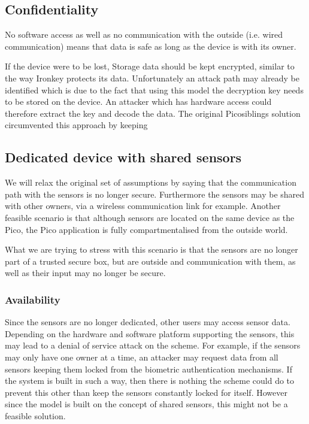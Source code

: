 	\subsection*{Confidentiality}
	No software access as well as no communication with the outside (i.e. wired communication) means that data is safe as long as the device is with its owner.
	
	If the device were to be lost, 
	Storage data should be kept encrypted, similar to the way Ironkey \cite{} protects its data. Unfortunately an attack path may already be identified which is due to the fact that using this model the decryption key needs to be stored on the device. An attacker which has hardware access could therefore extract the key and decode the data. The original Picosiblings solution circumvented this approach by keeping 

\subsection{Dedicated device with shared sensors}
We will relax the original set of assumptions by saying that the communication path with the sensors is no longer secure. Furthermore the sensors may be shared with other owners, via a wireless communication link for example. Another feasible scenario is that although sensors are located on the same device as the Pico, the Pico application is fully compartmentalised from the outside world. 

What we are trying to stress with this scenario is that the sensors are no longer part of a trusted secure box, but are outside and communication with them, as well as their input may no longer be secure.

	\subsubsection*{Availability}
	Since the sensors are no longer dedicated, other users may access sensor data. Depending on the hardware and software platform supporting the sensors, this may lead to a denial of service attack on the scheme. For example, if the sensors may only have one owner at a time, an attacker may request data from all sensors keeping them locked from the biometric authentication mechanisms. If the system is built in such a way, then there is nothing the scheme could do to prevent this other than keep the sensors constantly locked for itself. However since the model is built on the concept of shared sensors, this might not be a feasible solution.
	
